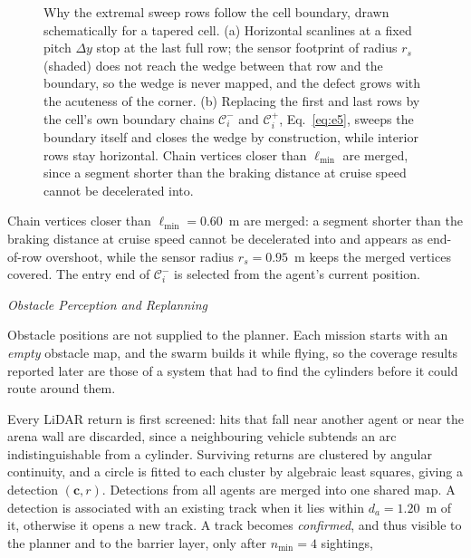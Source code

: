 \documentclass[10pt,letterpaper]{article}
\newcommand{\headingthree}[1]{%
    \par\vspace{6pt}%
    {\centering\fontsize{10}{12}\selectfont\itshape #1\par}%
    \vspace{2pt}\noindent\ignorespaces}
\begin{document}
\begin{figure}[tbp]
    \caption{Why the extremal sweep rows follow the cell boundary, drawn schematically for a
        tapered cell. (a) Horizontal scanlines at a fixed pitch $\Delta y$ stop at the last
        full row; the sensor footprint of radius $r_s$ (shaded) does not reach the wedge
        between that row and the boundary, so the wedge is never mapped, and the defect grows
        with the acuteness of the corner. (b) Replacing the first and last rows by the cell's
        own boundary chains $\mathcal{C}^-_i$ and $\mathcal{C}^+_i$, Eq.~\eqref{eq:e5}, sweeps
        the boundary itself and closes the wedge by construction, while interior rows stay
        horizontal. Chain vertices closer than $\ell_{\min}$ are merged, since a segment
        shorter than the braking distance at cruise speed cannot be decelerated into.}
    \label{fig:wedge}
\end{figure}

Chain vertices closer
than $\ell_{\min}=0.60$~m are merged: a segment shorter than the braking distance at cruise
speed cannot be decelerated into and appears as end-of-row overshoot, while the sensor
radius $r_s=0.95$~m keeps the merged vertices covered. The entry end of $\mathcal{C}^-_i$ is
selected from the agent's current position.

\headingthree{Obstacle Perception and Replanning}

Obstacle positions are not supplied to the planner. Each mission starts with an
\emph{empty} obstacle map, and the swarm builds it while flying, so the coverage results
reported later are those of a system that had to find the cylinders before it could route
around them.

Every LiDAR return is first screened: hits that fall near another agent or near the arena
wall are discarded, since a neighbouring vehicle subtends an arc indistinguishable from a
cylinder. Surviving returns are clustered by angular continuity, and a circle is fitted to
each cluster by algebraic least squares, giving a detection $(\mathbf{c},r)$. Detections
from all agents are merged into one shared map. A detection is associated with an existing
track when it lies within $d_a=1.20$~m of it, otherwise it opens a new track. A track
becomes \emph{confirmed}, and thus visible to the planner and to the barrier layer, only
after $n_{\min}=4$ sightings,
\end{document}
